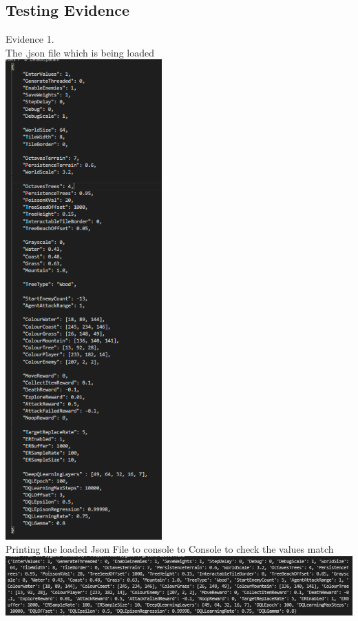 \begin{flushleft}
    \pagebreak
    \vspace{1cm}
    \subsection{Testing Evidence}
    \vspace{0.5cm}

    \setcounter{magicrownumbers}{0}
    \normalsize
    \begin{center}
        {\large Evidence 1.\rn }\\ 
        \vspace{0.3cm}
        The .json file which is being loaded \\
        \includegraphics[width=6cm]{Images/Testing/T1.1.1.PNG} \\
        Printing the loaded Json File to console to Console to check the values match\\
        \includegraphics[width=16cm]{Images/Testing/T1.1.2.PNG} \\
        \vspace{1cm}


\end{center}
\end{flushleft}
